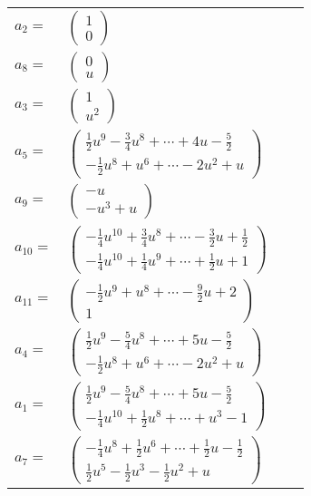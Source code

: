 \documentclass[1p]{elsarticle_modified}
\theoremstyle{definition}
\begin{document}
\begin{tabular}{m{7pt} m{180pt} m{7pt} m{180pt} }
\flushright $a_{2}=$&$\begin{pmatrix}1\\0\end{pmatrix}$ \\
\flushright $a_{8}=$&$\begin{pmatrix}0\\u\end{pmatrix}$ \\
\flushright $a_{3}=$&$\begin{pmatrix}1\\u^2\end{pmatrix}$ \\
\flushright $a_{5}=$&$\begin{pmatrix}\frac{1}{2} u^9-\frac{3}{4} u^8+\cdots+4 u-\frac{5}{2}\\-\frac{1}{2} u^8+u^6+\cdots-2 u^2+u\end{pmatrix}$ \\
\flushright $a_{9}=$&$\begin{pmatrix}- u\\- u^3+u\end{pmatrix}$ \\
\flushright $a_{10}=$&$\begin{pmatrix}-\frac{1}{4} u^{10}+\frac{3}{4} u^8+\cdots-\frac{3}{2} u+\frac{1}{2}\\-\frac{1}{4} u^{10}+\frac{1}{4} u^9+\cdots+\frac{1}{2} u+1\end{pmatrix}$ \\
\flushright $a_{11}=$&$\begin{pmatrix}-\frac{1}{2} u^9+u^8+\cdots-\frac{9}{2} u+2\\1\end{pmatrix}$ \\
\flushright $a_{4}=$&$\begin{pmatrix}\frac{1}{2} u^9-\frac{5}{4} u^8+\cdots+5 u-\frac{5}{2}\\-\frac{1}{2} u^8+u^6+\cdots-2 u^2+u\end{pmatrix}$ \\
\flushright $a_{1}=$&$\begin{pmatrix}\frac{1}{2} u^9-\frac{5}{4} u^8+\cdots+5 u-\frac{5}{2}\\-\frac{1}{4} u^{10}+\frac{1}{2} u^8+\cdots+u^3-1\end{pmatrix}$ \\
\flushright $a_{7}=$&$\begin{pmatrix}-\frac{1}{4} u^8+\frac{1}{2} u^6+\cdots+\frac{1}{2} u-\frac{1}{2}\\\frac{1}{2} u^5-\frac{1}{2} u^3-\frac{1}{2} u^2+u\end{pmatrix}$ \\

\end{tabular}
\end{document}
